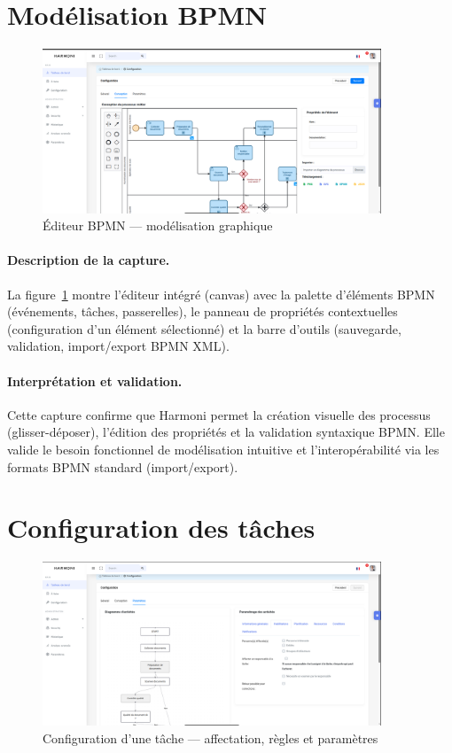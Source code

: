 \section{Modélisation BPMN}

\begin{figure}[H]
    \centering
    \includegraphics[width=0.9\textwidth]{Images/modelisation.png}
    \caption{Éditeur BPMN — modélisation graphique}
    \label{fig:modelisation}
\end{figure}

\paragraph{Description de la capture.}  
La figure~\ref{fig:modelisation} montre l’éditeur intégré (canvas) avec la palette d’éléments BPMN (événements, tâches, passerelles), le panneau de propriétés contextuelles (configuration d’un élément sélectionné) et la barre d’outils (sauvegarde, validation, import/export BPMN XML).

\paragraph{Interprétation et validation.}  
Cette capture confirme que Harmoni permet la création visuelle des processus (glisser-déposer), l’édition des propriétés et la validation syntaxique BPMN. Elle valide le besoin fonctionnel de modélisation intuitive et l’interopérabilité via les formats BPMN standard (import/export).

\section{Configuration des tâches}

\begin{figure}[H]
    \centering
    \includegraphics[width=0.9\textwidth]{Images/configuration.png}
    \caption{Configuration d’une tâche — affectation, règles et paramètres}
    \label{fig:configuration}
\end{figure}

